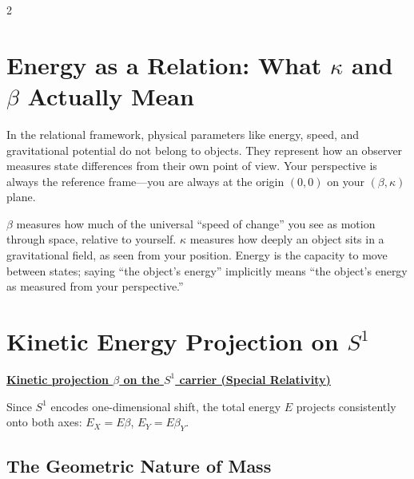 \documentclass[10pt, a4paper]{article}
\begin{document}
\begin{multicols}{2}

\section{Energy as a Relation: What $\kappa$ and $\beta$ Actually Mean}
\hypertarget{sec:kappabeta}{}\label{sec:kappabeta}

In the relational framework, physical parameters like energy, speed, and gravitational potential do not belong to objects. They represent how an observer measures state differences from their own point of view. Your perspective is always the reference frame---you are always at the origin $(0,0)$ on your $(\beta,\kappa)$ plane.

$\beta$ measures how much of the universal ``speed of change'' you see as motion through space, relative to yourself. $\kappa$ measures how deeply an object sits in a gravitational field, as seen from your position. Energy is the capacity to move between states; saying ``the object's energy'' implicitly means ``the object's energy as measured from your perspective.''



\section{Kinetic Energy Projection on $S^1$}

\begin{tcolorbox}[colback=gray!5, colframe=black!80!black, title=Desmos project]
\textbf{\href{https://www.desmos.com/geometry/6k1um2qbzm}{Kinetic projection $\beta$ on the $S^1$ carrier (Special Relativity)}}
\end{tcolorbox}

Since $S^{1}$ encodes one-dimensional shift, the total energy $E$ projects consistently onto both axes:
$E_{X} = E\beta$, $E_{Y} = E\beta_{Y}$.

\subsection{The Geometric Nature of Mass}


\end{multicols}
\end{document}
